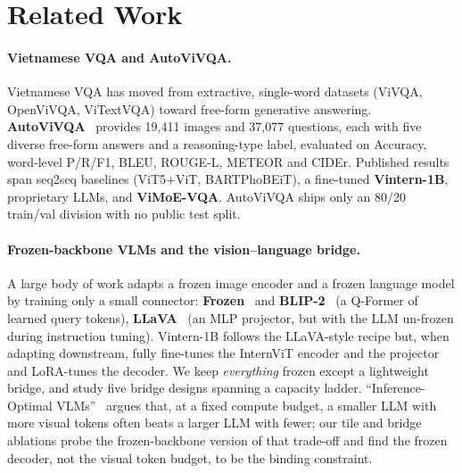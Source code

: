 \section{Related Work}
\label{sec:related}

\paragraph{Vietnamese VQA and AutoViVQA.}
Vietnamese VQA has moved from extractive, single-word datasets (ViVQA,
OpenViVQA, ViTextVQA) toward free-form generative answering.
\textbf{AutoViVQA}~\cite{autovivqa} provides 19{,}411 images and 37{,}077
questions, each with five diverse free-form answers and a reasoning-type label,
evaluated on Accuracy, word-level P/R/F1, BLEU, ROUGE-L, METEOR and CIDEr.
Published results span seq2seq baselines (ViT5+ViT, BARTPhoBEiT), a fine-tuned
\textbf{Vintern-1B}, proprietary LLMs, and \textbf{ViMoE-VQA}. AutoViVQA ships
only an 80/20 train/val division with no public test split.

\paragraph{Frozen-backbone VLMs and the vision--language bridge.}
A large body of work adapts a frozen image encoder and a frozen language model by
training only a small connector: \textbf{Frozen}~\cite{frozen} and
\textbf{BLIP-2}~\cite{blip2} (a Q-Former of learned query tokens),
\textbf{LLaVA}~\cite{llava} (an MLP projector, but with the LLM un-frozen during
instruction tuning). Vintern-1B follows the LLaVA-style recipe but, when adapting
downstream, fully fine-tunes the InternViT encoder and the projector and
LoRA-tunes the decoder. We keep \emph{everything} frozen except a lightweight
bridge, and study five bridge designs spanning a capacity ladder.
``Inference-Optimal VLMs''~\cite{inferenceoptimalvlms} argues that, at a fixed
compute budget, a smaller LLM with more visual tokens often beats a larger LLM
with fewer; our tile and bridge ablations probe the frozen-backbone version of
that trade-off and find the frozen decoder, not the visual token budget, to be
the binding constraint.

